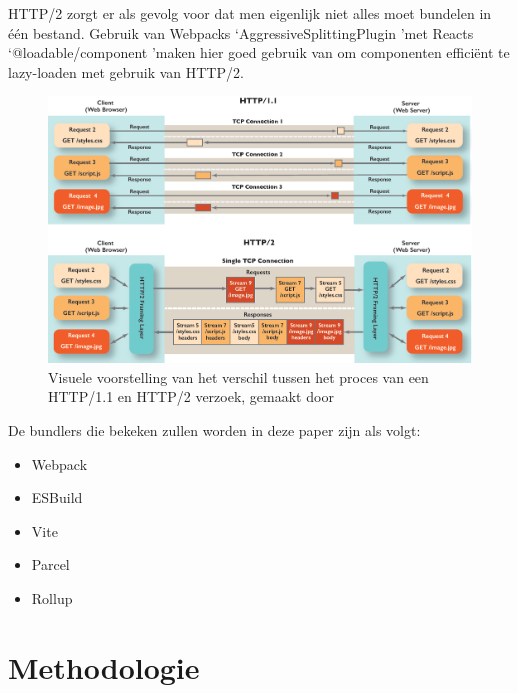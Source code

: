 HTTP/2 zorgt er als gevolg voor dat men eigenlijk niet alles moet bundelen in één bestand. Gebruik van Webpacks \lq AggressiveSplittingPlugin \rq met Reacts \lq @loadable/component \rq maken hier goed gebruik van om componenten efficiënt te lazy-loaden met gebruik van HTTP/2. \autocite{fraser_2020}

\begin{figure}[!htp]
  \includegraphics[width=\linewidth]{http.png}
  \caption{Visuele voorstelling van het verschil tussen het proces van een HTTP/1.1 en HTTP/2 verzoek, gemaakt door \cite{pollard_2018}}
  \label{fig:HttpComparison}
\end{figure}

De bundlers die bekeken zullen worden in deze paper zijn als volgt:

\begin{itemize}
    \item Webpack
    \item ESBuild
    \item Vite
    \item Parcel
    \item Rollup
\end{itemize}



\section{Methodologie}
\label{sec:methodologie}


